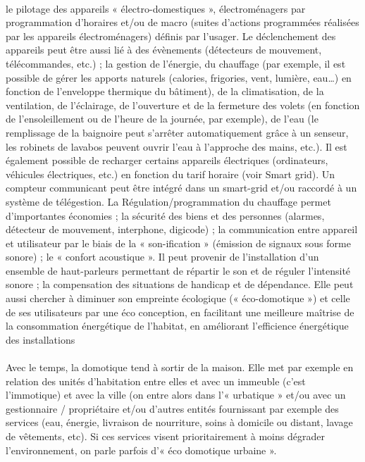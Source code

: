             \paragraph{}
le pilotage des appareils « électro-domestiques », électroménagers par programmation d'horaires et/ou de macro (suites d'actions programmées réalisées par les appareils électroménagers) définis par l'usager. Le déclenchement des appareils peut être aussi lié à des évènements (détecteurs de mouvement, télécommandes, etc.) ;
la gestion de l'énergie, du chauffage (par exemple, il est possible de gérer les apports naturels (calories, frigories, vent, lumière, eau…) en fonction de l'enveloppe thermique du bâtiment), de la climatisation, de la ventilation, de l'éclairage, de l’ouverture et de la fermeture des volets (en fonction de l'ensoleillement ou de l'heure de la journée, par exemple), de l'eau (le remplissage de la baignoire peut s’arrêter automatiquement grâce à un senseur, les robinets de lavabos peuvent ouvrir l’eau à l’approche des mains, etc.). Il est également possible de recharger certains appareils électriques (ordinateurs, véhicules électriques, etc.) en fonction du tarif horaire (voir Smart grid). Un compteur communicant peut être intégré dans un smart-grid et/ou raccordé à un système de télégestion. La Régulation/programmation du chauffage permet d'importantes économies ;
la sécurité des biens et des personnes (alarmes, détecteur de mouvement, interphone, digicode) ;
la communication entre appareil et utilisateur par le biais de la « son-ification » (émission de signaux sous forme sonore) ;
le « confort acoustique ». Il peut provenir de l'installation d'un ensemble de haut-parleurs permettant de répartir le son et de réguler l’intensité sonore ;
la compensation des situations de handicap et de dépendance.
Elle peut aussi chercher à diminuer son empreinte écologique (« éco-domotique ») et celle de ses utilisateurs par une éco conception, en facilitant une meilleure maîtrise de la consommation énergétique de l'habitat, en améliorant l'efficience énergétique des installations
            \paragraph{}
Avec le temps, la domotique tend à sortir de la maison. Elle met par exemple en relation des unités d'habitation entre elles et avec un immeuble (c'est l'immotique) et avec la ville (on entre alors dans l'« urbatique » et/ou avec un gestionnaire / propriétaire et/ou d'autres entités fournissant par exemple des services (eau, énergie, livraison de nourriture, soins à domicile ou distant, lavage de vêtements, etc). Si ces services visent prioritairement à moins dégrader l'environnement, on parle parfois d'« éco domotique urbaine ».

